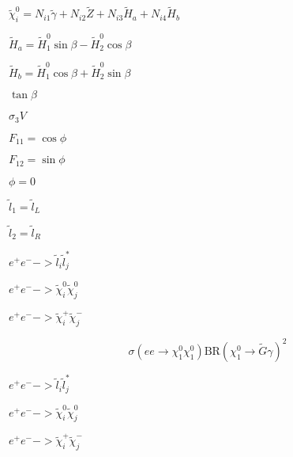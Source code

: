 \documentclass{article}
\begin{document}
$\tilde\chi_i^0 = N_{i1} \tilde\gamma + N_{i2} \tilde Z + N_{i3} \tilde H_a + N_{i4} \tilde H_b$
\pagebreak

$\tilde H_a = \tilde H_1^0 \sin\beta - \tilde H_2^0 \cos\beta$
\pagebreak

$\tilde H_b = \tilde H_1^0 \cos\beta + \tilde H_2^0 \sin\beta$
\pagebreak

$\tan\beta$
\pagebreak

$\sigma_3 V$
\pagebreak

$F_{11}=\cos\phi$
\pagebreak

$F_{12}=\sin\phi$
\pagebreak

$\phi = 0$
\pagebreak

$\tilde l_1 = \tilde l_L$
\pagebreak

$\tilde l_2 = \tilde l_R$
\pagebreak

$ e^+e^- -> \tilde l_i \tilde l_j^* $
\pagebreak

$ e^+e^- -> \tilde\chi^0_i \tilde\chi^0_j $
\pagebreak

$ e^+e^- -> \tilde\chi^+_i \tilde\chi^-_j $
\pagebreak

\[ \sigma(ee \to \chi^0_1\chi^0_1) \textrm{BR}(\chi^0_1 \to \tilde{G}\gamma)^2 \]
\pagebreak

$e^+e^- -> \tilde l_i \tilde l_j^*$
\pagebreak

$e^+e^- -> \tilde\chi^0_i \tilde\chi^0_j$
\pagebreak

$e^+e^- -> \tilde\chi^+_i \tilde\chi^-_j$
\pagebreak
\end{document}

